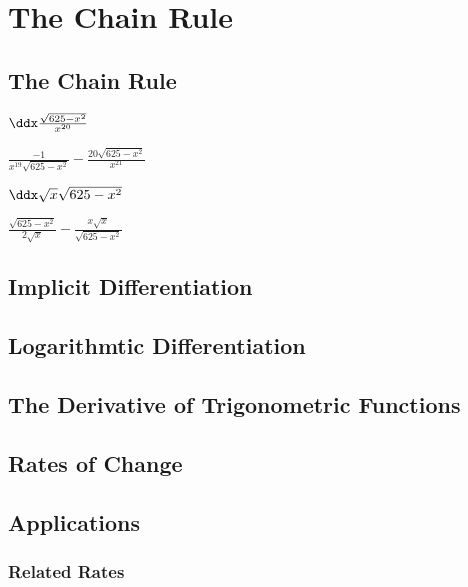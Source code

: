 
\chapter{The Chain Rule}


\section{The Chain Rule}

\begin{exercise} $\ddx\frac{\sqrt{625-x^2}}{x^{20}}$
\begin{answer} $\frac{-1}{x^{19}\sqrt{625-x^2}}-\frac{20\sqrt{625-x^2}}{x^{21}}$
\end{answer}\end{exercise}



\begin{exercise} $\ddx \sqrt{x}\sqrt{625-x^2}$
\begin{answer} $\frac{\sqrt{625-x^2}}{2\sqrt{x}}-\frac{x\sqrt{x}}{\sqrt{625-x^2}}$
\end{answer}\end{exercise}



\section{Implicit Differentiation}


\section{Logarithmtic Differentiation}









\section{The Derivative of Trigonometric Functions}



\section{Rates of Change}


\section{Applications}

\subsection{Related Rates}
